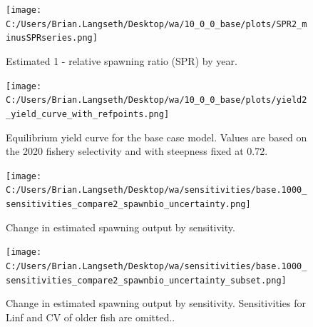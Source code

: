 \documentclass[11pt,
  english,
  a4paper,
]{article}
\begin{document}
\tagmcend\tagstructend


\begin{figure}
\centering
\texttt{[image: C:/Users/Brian.Langseth/Desktop/wa/10\_0\_0\_base/plots/SPR2\_minusSPRseries.png]}
\caption{Estimated 1 - relative spawning ratio (SPR) by year.\label{fig:1-spr}}
\end{figure}

\tagmcend\tagstructend


\begin{figure}
\centering
\texttt{[image: C:/Users/Brian.Langseth/Desktop/wa/10\_0\_0\_base/plots/yield2\_yield\_curve\_with\_refpoints.png]}
\caption{Equilibrium yield curve for the base case model. Values are based on the 2020 fishery selectivity and with steepness fixed at 0.72.\label{fig:yield}}
\end{figure}

\tagmcend\tagstructend


\begin{figure}
\centering
\texttt{[image: C:/Users/Brian.Langseth/Desktop/wa/sensitivities/base.1000\_sensitivities\_compare2\_spawnbio\_uncertainty.png]}
\caption{Change in estimated spawning output by sensitivity.\label{fig:sens-ssb}}
\end{figure}

\tagmcend\tagstructend


\begin{figure}
\centering
\texttt{[image: C:/Users/Brian.Langseth/Desktop/wa/sensitivities/base.1000\_sensitivities\_compare2\_spawnbio\_uncertainty\_subset.png]}
\caption{Change in estimated spawning output by sensitivity. Sensitivities for Linf and CV of older fish are omitted..\label{fig:sens-ssb-subset}}
\end{figure}
\end{document}
